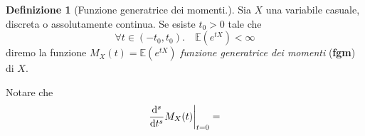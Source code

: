 \documentclass[fontsize=11pt,paper=A4,oneside,index=totoc,hyperref]{book}
\theoremstyle{definition}
\newtheorem{dfn}{Definizione}[]
\theoremstyle{plain}
\newcommand{\Asp}{\mathbb{E}}
\newcommand\restr[2]{{%
  \left.\kern-\nulldelimiterspace %
  #1 %
  \vphantom{\big|} %
  \right|_{#2} %
  }}
\begin{document}
\begin{dfn}[Funzione generatrice dei momenti.]
  Sia \(X\) una variabile casuale, discreta o assolutamente continua. Se esiste \(t_0 > 0\) tale che
  \begin{equation}
    \forall t \in (-t_0,t_0).\quad \Asp(e^{tX}) < \infty
  \end{equation}
  diremo la funzione \(M_X(t) = \Asp(e^{tX})\) \emph{funzione generatrice dei momenti} ({\bf fgm}) di \(X\).
\end{dfn}
Notare che
\begin{equation}
  \restr{\frac{\mathrm{d}^s}{\mathrm{d}t^s}M_X(t)}{t=0} =
\end{equation}
\end{document}
